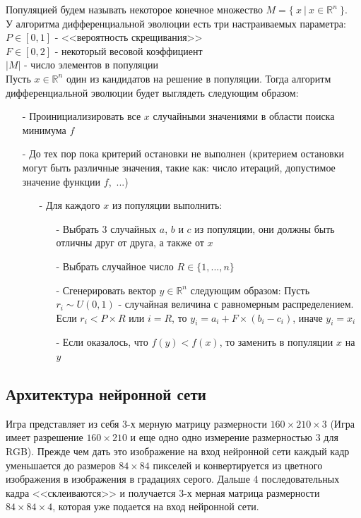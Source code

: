 \documentclass[12pt]{article}
\begin{document}
        Популяцией будем называть некоторое конечное множество $M=\{~x~|~x \in \mathbb{R}^n~\}$. \\

        У алгоритма дифференциальной эволюции есть три настраиваемых параметра: \\ 
        $P \in [0, 1]$ - <<вероятность скрещивания>> \\
        $F \in [0, 2]$ - некоторый весовой коэффициент \\
        $|M|$ - число элементов в популяции \\

        Пусть $x \in \mathbb{R}^n$ один из кандидатов на решение в популяции. Тогда алгоритм дифференциальной эволюции будет выглядеть следующим образом:

        \begin{itemize}
            \item[-] Проинициализировать все $x$ случайными значениями в области поиска минимума $f$
            \item[-] До тех пор пока критерий остановки не выполнен (критерием остановки могут быть различные значения, такие как: число итераций, допустимое значение функции $f$,~...)
            \begin{itemize}
                \item[-] Для каждого $x$ из популяции выполнить:
                \begin{itemize}
                    \item[-] Выбрать 3 случайных $a$, $b$ и $c$ из популяции, они должны быть отличны друг от друга, а также от $x$
                    \item[-] Выбрать случайное число $R \in \{1, ..., n\}$
                    \item[-] Сгенерировать вектор $y \in \mathbb{R}^n$ следующим образом: Пусть $r_i \sim U(0, 1)$ - случайная величина с равномерным распределением. Если $r_i < P \times R$ или $i = R$, то $y_i = a_i + F \times (b_i - c_i)$, иначе $y_i = x_i$
                    \item[-] Если оказалось, что $f(y) < f(x)$, то заменить в популяции $x$ на $y$
                \end{itemize}
            \end{itemize}
        \end{itemize}

        \subsection{Архитектура нейронной сети}
            Игра представляет из себя $3$-х мерную матрицу размерности $160 \times 210 \times 3$ (Игра имеет разрешение $160 \times 210$ и еще одно одно измерение размерностью $3$ для RGB). Прежде чем дать это изображение на вход нейронной сети каждый кадр уменьшается до размеров $84 \times 84$ пикселей и конвертируется из цветного изображения в изображения в градациях серого. Дальше 4 последовательных кадра <<склеиваются>> и получается $3$-х мерная матрица размерности $84 \times 84 \times 4$, которая уже подается на вход нейронной сети. \\
\end{document}
